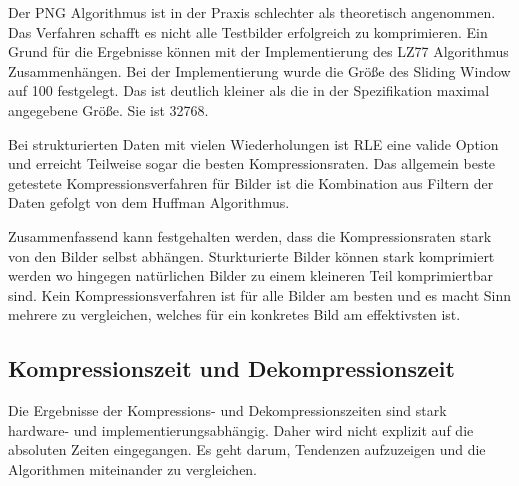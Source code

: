\documentclass[conference]{IEEEtran}
\begin{document}
Der PNG Algorithmus ist in der Praxis schlechter als theoretisch angenommen.
Das Verfahren schafft es nicht alle Testbilder erfolgreich zu komprimieren.
Ein Grund für die Ergebnisse können mit der Implementierung des
LZ77 Algorithmus Zusammenhängen.
Bei der Implementierung wurde die Größe des Sliding Window auf 100 festgelegt.
Das ist deutlich kleiner als die in der Spezifikation maximal angegebene Größe.
Sie ist 32768. \cite{w3c}

Bei strukturierten Daten mit vielen Wiederholungen ist RLE eine valide
Option und erreicht Teilweise sogar die besten Kompressionsraten.
Das allgemein beste getestete Kompressionsverfahren für Bilder ist die Kombination
aus Filtern der Daten gefolgt von dem Huffman Algorithmus.

Zusammenfassend kann festgehalten werden, dass die Kompressionsraten
stark von den Bilder selbst abhängen.
Sturkturierte Bilder können stark komprimiert werden wo hingegen natürlichen Bilder
zu einem kleineren Teil komprimiertbar sind.
Kein Kompressionsverfahren ist für alle Bilder am besten und es macht Sinn
mehrere zu vergleichen, welches für ein konkretes Bild am effektivsten ist.


\subsection{Kompressionszeit und Dekompressionszeit}

Die Ergebnisse der Kompressions- und Dekompressionszeiten sind stark
hardware- und implementierungsabhängig.
Daher wird nicht explizit auf die absoluten Zeiten eingegangen.
Es geht darum, Tendenzen aufzuzeigen und die Algorithmen miteinander zu vergleichen.
\end{document}
